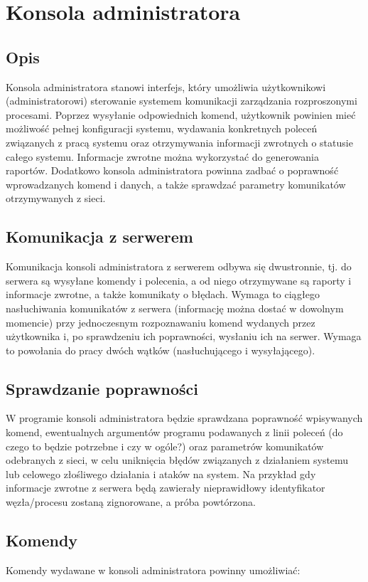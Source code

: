 \documentclass[10pt,a4paper]{article}
\begin{document}
    
    
    \section{Konsola administratora}
		\subsection{Opis}
			Konsola administratora stanowi interfejs, który umożliwia użytkownikowi (administratorowi)  sterowanie systemem komunikacji zarządzania rozproszonymi procesami. Poprzez wysyłanie odpowiednich komend, użytkownik powinien mieć możliwość pełnej konfiguracji systemu, wydawania konkretnych poleceń związanych z pracą systemu oraz otrzymywania informacji zwrotnych o statusie całego systemu. Informacje zwrotne można wykorzystać do generowania raportów. Dodatkowo konsola administratora powinna zadbać o poprawność wprowadzanych komend i danych, a także sprawdzać parametry komunikatów otrzymywanych z sieci.
		
		\subsection{Komunikacja z serwerem}
			Komunikacja konsoli administratora z serwerem odbywa się dwustronnie, tj. do serwera są wysyłane komendy i polecenia, a od niego otrzymywane są raporty i informacje zwrotne, a także komunikaty o błędach. Wymaga to ciągłego nasłuchiwania komunikatów z serwera (informację można dostać w dowolnym momencie) przy jednoczesnym rozpoznawaniu komend wydanych przez użytkownika i, po sprawdzeniu ich poprawności, wysłaniu ich na serwer. Wymaga to powołania do pracy dwóch wątków (nasłuchującego i wysyłającego).
		
		\subsection{Sprawdzanie poprawności}
			W programie konsoli administratora będzie sprawdzana poprawność wpisywanych komend, ewentualnych argumentów programu podawanych z linii poleceń (do czego to będzie potrzebne i czy w ogóle?) oraz parametrów komunikatów odebranych z sieci, w celu uniknięcia błędów związanych z działaniem systemu lub celowego złośliwego działania i ataków na system. Na przykład gdy informacje zwrotne z serwera będą zawierały nieprawidłowy identyfikator węzła/procesu zostaną zignorowane, a próba powtórzona.
		
		\subsection{Komendy}
			Komendy wydawane w konsoli administratora powinny umożliwiać:
			
\end{document}
